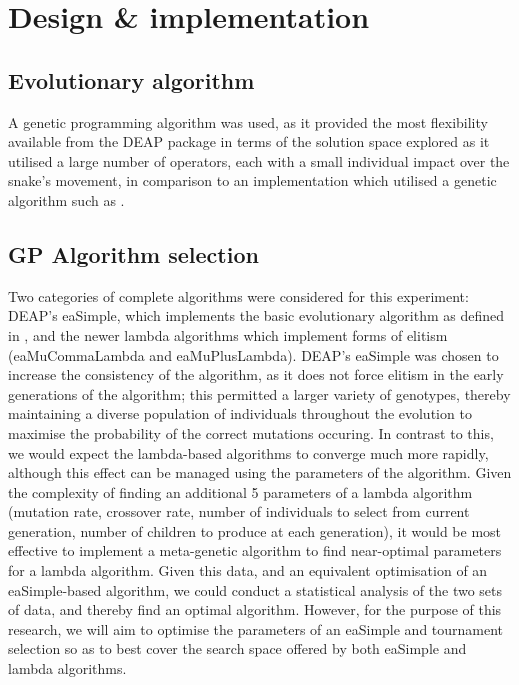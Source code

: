 \documentclass[british,10pt,a4paper]{article}
\begin{document}
\section{Design \& implementation}
\subsection{Evolutionary algorithm}
A genetic programming algorithm was used, as it provided the most flexibility available from the DEAP package in terms of the solution space explored as it utilised a large number of operators, each with a small individual impact over the snake's movement, in comparison to an implementation which utilised a genetic algorithm such as \citet{Yeh2016-ts}.

\subsection{GP Algorithm selection}
Two categories of complete algorithms were considered for this experiment: DEAP's eaSimple, which implements the basic evolutionary algorithm as defined in \citet{Back2000-og}, and the newer lambda algorithms which implement forms of elitism (eaMuCommaLambda and eaMuPlusLambda). DEAP's eaSimple was chosen to increase the consistency of the algorithm, as it does not force elitism in the early generations of the algorithm; this permitted a larger variety of genotypes, thereby maintaining a diverse population of individuals throughout the evolution to maximise the probability of the correct mutations occuring. In contrast to this, we would expect the lambda-based algorithms to converge much more rapidly, although this effect can be managed using the parameters of the algorithm. Given the complexity of finding an additional 5 parameters of a lambda algorithm (mutation rate, crossover rate, number of individuals to select from current generation, number of children to produce at each generation), it would be most effective to implement a meta-genetic algorithm to find near-optimal parameters for a lambda algorithm. Given this data, and an equivalent optimisation of an eaSimple-based algorithm, we could conduct a statistical analysis of the two sets of data, and thereby find an optimal algorithm. However, for the purpose of this research, we will aim to optimise the parameters of an eaSimple and tournament selection so as to best cover the search space offered by both eaSimple and lambda algorithms.
\end{document}
